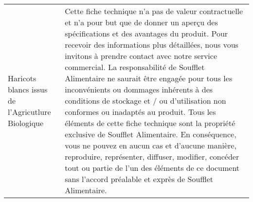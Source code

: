\begin{tabular}{p{7cm}p{7cm}}
                                                                                                                                                                                                                                                                                                                                                                                                                            Haricots blancs issus de l'Agricutlure Biologique &                                                                                                                                                                                                                                                                                                                                                                                                                                                                                                                                                                                                    Cette fiche technique n’a pas de valeur contractuelle et n’a pour but que de donner un aperçu des  \newline spécifications et des avantages du produit. Pour recevoir des informations plus détaillées, nous vous  \newline invitons à prendre contact avec notre service commercial. La responsabilité de Soufflet Alimentaire ne  \newline saurait être engagée pour tous les inconvénients ou dommages inhérents à des conditions de stockage  \newline et / ou d’utilisation non conformes ou inadaptés au produit. Tous les éléments de cette fiche technique  \newline sont la propriété exclusive de Soufflet Alimentaire. En conséquence, vous ne pouvez en aucun cas et  \newline d’aucune manière, reproduire, représenter, diffuser, modifier, concéder tout ou partie de l’un des  \newline éléments de ce document sans  l’accord préalable et exprès de Soufflet Alimentaire. \\

\end{tabular}
